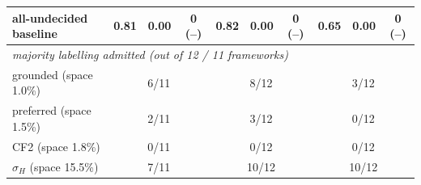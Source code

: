 \begin{table}[t]
{\begin{tabular}{lccccccccc}
all-undecided baseline & 0.81 & 0.00 & 0 (--) & 0.82 & 0.00 & 0 (--) & 0.65 & 0.00 & 0 (--)\\
\midrule
\multicolumn{10}{l}{\emph{majority labelling admitted (out of 12 / 11 frameworks)}}\\
grounded (space 1.0\%) & \multicolumn{3}{c}{6/11} & \multicolumn{3}{c}{8/12} & \multicolumn{3}{c}{3/12}\\
preferred (space 1.5\%) & \multicolumn{3}{c}{2/11} & \multicolumn{3}{c}{3/12} & \multicolumn{3}{c}{0/12}\\
CF2 (space 1.8\%) & \multicolumn{3}{c}{0/11} & \multicolumn{3}{c}{0/12} & \multicolumn{3}{c}{0/12}\\
$\sigma_H$ (space 15.5\%) & \multicolumn{3}{c}{7/11} & \multicolumn{3}{c}{10/12} & \multicolumn{3}{c}{10/12}\\
\bottomrule\end{tabular}}\end{table}
